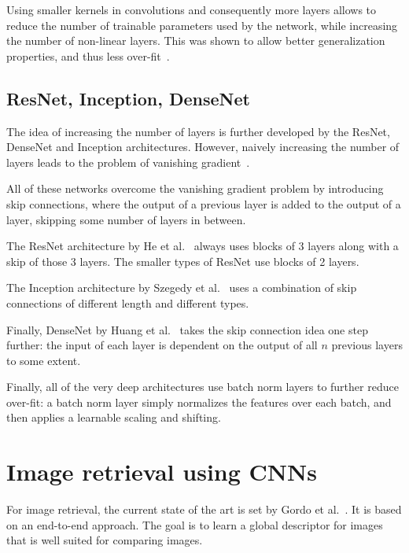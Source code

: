 Using smaller kernels in convolutions and consequently more layers
allows to reduce the number of trainable parameters used by the
network, while increasing the number of non-linear layers.
This was shown to allow better generalization properties, and thus less
over-fit~\cite{simonyan_very_2014}.

\subsection{ResNet, Inception, DenseNet}
The idea of increasing the number of layers is further developed
by the ResNet, DenseNet and Inception architectures. However,
naively increasing the number of layers leads to the problem of
vanishing gradient~\cite{hinton_fast_2006}.

All of these networks overcome the vanishing gradient problem by
introducing skip connections, where the output of a previous layer
is added to the output of a layer, skipping some number of layers in
between.

The ResNet architecture by He et al.~\cite{he_deep_2015} always uses blocks
of 3 layers along with a skip of those 3 layers. The smaller types of
ResNet use blocks of 2 layers.

The Inception architecture by Szegedy et al.~\cite{szegedy_inception-v4_2016}
uses a combination of skip connections of different length and different
types.

Finally, DenseNet by Huang et al.~\cite{huang_densely_2016} takes the
skip connection idea one step further:
the input of each layer is dependent on the output of all $n$ previous layers
to some extent.

Finally, all of the very deep architectures use batch norm layers to further
reduce over-fit: a batch norm layer simply normalizes the features over each
batch, and then applies a learnable scaling and shifting.

\section{Image retrieval using CNNs}
For image retrieval, the current state of the art is set by
Gordo et al.~\cite{gordo_deep_2016}. It is based on an
end-to-end approach. The goal is to learn a global descriptor for images
that is well suited for comparing images.

